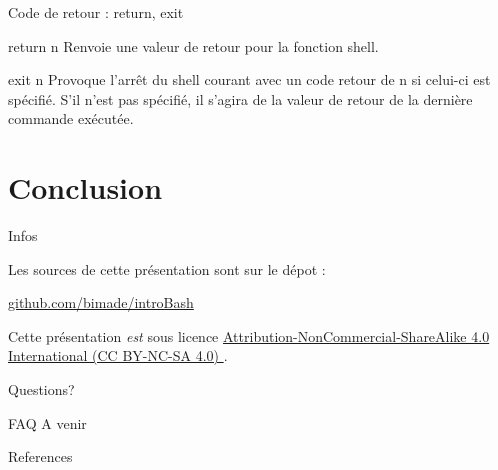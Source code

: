 \documentclass[10pt]{beamer}
\begin{document}
\begin{frame}{Code de retour : return, exit}
  
\begin{alertblock}{return n}
Renvoie une valeur de retour pour la fonction shell.
\end{alertblock}

\begin{alertblock}{exit n}
Provoque l’arrêt du shell courant avec un code retour de n si celui-ci est spécifié. S’il n’est pas spécifié, il s’agira de la valeur de retour de la dernière commande exécutée.
\end{alertblock}
\end{frame}


\section{Conclusion}

\begin{frame}{Infos}

  Les sources de cette présentation sont sur le dépot :

  \begin{center}\url{github.com/bimade/introBash}\end{center}

  Cette présentation \emph{est} sous licence
  \href{http://creativecommons.org/licenses/by-nc-sa/4.0/}
  {Attribution-NonCommercial-ShareAlike 4.0 International (CC BY-NC-SA 4.0) }.

  \begin{center}\ccbyncsa\end{center}

\end{frame}

{
\begin{frame}[standout]
  Questions?
\end{frame}
}

\appendix

\begin{frame}[fragile]{FAQ}
  A venir
\end{frame}

\begin{frame}[allowframebreaks]{References}

  
  

\end{frame}
\end{document}
